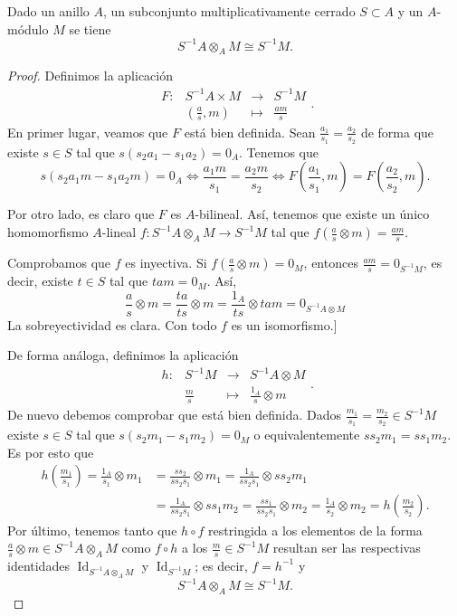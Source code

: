 \documentclass[../main.tex]{subfiles}
\begin{document}
	\begin{proposition} Dado un anillo $A$, un subconjunto multiplicativamente cerrado $S\subset A$ y un $A$-módulo $M$ se tiene
		$$S^{-1}A\otimes_AM\cong S^{-1}M.$$
	\end{proposition}
	\begin{proof}
		Definimos la aplicación
		$$\begin{array}{rrcl}
		F:&S^{-1}A\times M&\longrightarrow&S^{-1}M\\
		&(\frac{a}{s},m)&\longmapsto&\frac{am}{s}
		\end{array}.$$
		En primer lugar, veamos que $F$ está bien definida. Sean $\frac{a_1}{s_1}=\frac{a_2}{s_2}$ de forma que existe $s\in S$ tal que $s(s_2a_1-s_1a_2)=0_A$. Tenemos que
		$$s(s_2a_1m-s_1a_2m)=0_A\Longleftrightarrow \frac{a_1m}{s_1}=\frac{a_2m}{s_2}\Longleftrightarrow F\left(\frac{a_1}{s_1},m\right)=F\left(\frac{a_2}{s_2},m\right).$$

		Por otro lado, es claro que $F$ es $A$-bilineal. Así, tenemos que existe un único homomorfismo $A$-lineal $f: S^{-1}A\otimes_AM\longrightarrow S^{-1}M$ tal que $f(\frac{a}{s}\otimes m)=\frac{am}{s}$.

		Comprobamos que $f$ es inyectiva. Si $f(\frac{a}{s}\otimes m)=0_M$, entonces $\frac{am}{s}=0_{S^{-1}M}$, es decir, existe $t\in S$ tal que $tam=0_M$. Así,
		$$\frac{a}{s}\otimes m=\frac{ta}{ts}\otimes m=\frac{1_A}{ts}\otimes tam=0_{S^{-1}A\otimes M}$$
		La sobreyectividad es clara. Con todo $f$ es un isomorfismo.]

		De forma análoga, definimos la aplicación
		$$\begin{array}{rrcl}
		h:&S^{-1}M&\longrightarrow&S^{-1}A\otimes M\\
		&\frac{m}{s}&\longmapsto&\frac{1_A}{s}\otimes m
		\end{array}.$$
		De nuevo debemos comprobar que está bien definida. Dados $\frac{m_1}{s_1}=\frac{m_2}{s_2}\in S^{-1}M$ existe $s\in S$ tal que $s(s_2m_1-s_1m_2)=0_M$ o equivalentemente $ss_2m_1=ss_1m_2$. Es por esto que
		\begin{align*}
		h\left(\frac{m_1}{s_1}\right)=\frac{1_A}{s_1}\otimes m_1&=\frac{ss_2}{ss_2s_1}\otimes m_1=\frac{1_A}{ss_2s_1}\otimes ss_2m_1\\
		&=\frac{1_A}{ss_2s_1}\otimes ss_1m_2=\frac{ss_1}{ss_2s_1}\otimes m_2=\frac{1_A}{s_2}\otimes m_2=h\left(\frac{m_2}{s_2}\right).
		\end{align*}
		Por último, tenemos tanto que $h\circ f$ restringida a los elementos de la forma $\frac{a}{s}\otimes m\in S^{-1}A\otimes_A M$ como $f\circ h$ a los $\frac{m}{s}\in S^{-1}M$ resultan ser las respectivas identidades $\operatorname{Id}_{S^{-1}A\otimes_A M}$ y $\operatorname{Id}_{S^{-1}M}$; es decir, $f=h^{-1}$ y $$S^{-1}A\otimes_A M\cong S^{-1}M.$$
	\end{proof}
\end{document}
